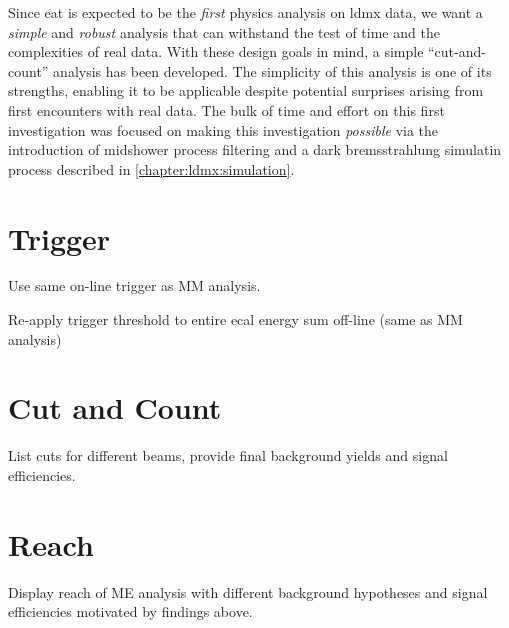 Since \ac{eat} is expected to be the \emph{first} physics
analysis on \ac{ldmx} data, we want a \emph{simple} and \emph{robust} analysis that can withstand
the test of time and the complexities of real data.
With these design goals in mind, a simple ``cut-and-count'' analysis has been developed.
The simplicity of this analysis is one of its strengths, enabling it to be applicable
despite potential surprises arising from first encounters with real data.
The bulk of time and effort on this first investigation was focused on making this
investigation \emph{possible} via the introduction of midshower process filtering
and a dark bremsstrahlung simulatin process described in \cref{chapter:ldmx:simulation}.

\section{Trigger}
Use same on-line trigger as MM analysis.

Re-apply trigger threshold to entire ecal energy sum off-line (same as MM analysis)

\section{Cut and Count}
List cuts for different beams, provide final background yields and signal efficiencies.

\section{Reach}
Display reach of ME analysis with different background hypotheses and signal efficiencies
motivated by findings above.

